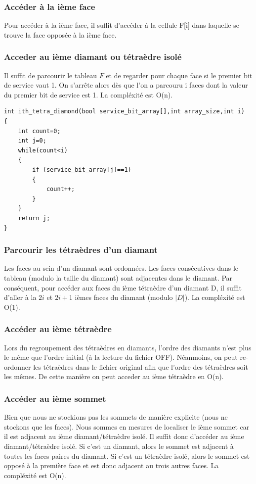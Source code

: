 \documentclass[a4paper,11pt,openany]{article}
\begin{document}
\subsubsection{Accéder à la ième face}
\noindent
Pour accéder à la ième face, il suffit d'accéder à la cellule F[i] dans laquelle se trouve la face opposée à la ième face.
\subsubsection{Acceder au ième diamant ou tétraèdre isolé}
\noindent
Il suffit de parcourir le tableau $F$ et de regarder pour chaque face si le premier bit de service vaut 1. On s'arrête alors dès que l'on a parcouru i faces dont la valeur du premier bit de service est 1. La compléxité est O(n).\\
\begin{lstlisting}
int ith_tetra_diamond(bool service_bit_array[],int array_size,int i)
{
    int count=0;
    int j=0;
    while(count<i)
    {
    	if (service_bit_array[j]==1)
    	{
    		count++;
    	}
    }
    return j;
}
\end{lstlisting}
\subsubsection{Parcourir les tétraèdres d'un diamant}
\noindent
Les faces au sein d'un diamant sont ordonnées. Les faces consécutives dans le tableau (modulo la taille du diamant) sont adjacentes dans le diamant. Par conséquent, pour accéder aux faces du ième tétraèdre d'un diamant D, il suffit d'aller à la $2i$ et $2i+1$ ièmes faces du diamant (modulo $|D|$). La compléxité est O(1).
\subsubsection{Accéder au ième tétraèdre}
\noindent
Lors du regroupement des tétraèdres en diamants, l'ordre des diamants n'est plus le même que l'ordre initial (à la lecture du fichier OFF). Néanmoins, on peut re-ordonner les tétraèdres dans le fichier original afin que l'ordre des tétraèdres soit les mêmes. De cette manière on peut acceder au ième tétraèdre en O(n).
\subsubsection{Accéder au ième sommet}
\noindent
Bien que nous ne stockions pas les sommets de manière explicite (nous ne stockons que les faces). Nous sommes en mesures de localiser le ième sommet car il est adjacent au ième diamant/tétraèdre isolé.
Il suffit donc d'accéder au ième diamant/tétraèdre isolé. Si c'est un diamant, alors le sommet est adjacent à toutes les faces paires du diamant. Si c'est un tétraèdre isolé, alors le sommet est opposé à la première face et est donc adjacent au trois autres faces. La compléxité est O(n).
\end{document}
